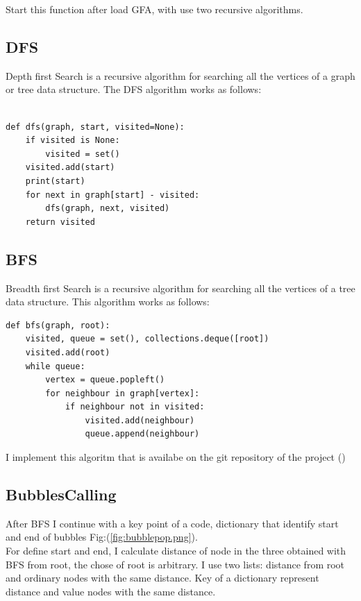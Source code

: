 Start this function after load GFA, with use two recursive algorithms. 

\subsection{DFS}
Depth first Search is a recursive algorithm for searching all the vertices of a graph or tree data structure.
The DFS algorithm works as follows:

\begin{verbatim}

def dfs(graph, start, visited=None):
    if visited is None:
        visited = set()
    visited.add(start)
    print(start)
    for next in graph[start] - visited:
        dfs(graph, next, visited)
    return visited

\end{verbatim}

\subsection{BFS}
Breadth first Search is a recursive algorithm for searching all the vertices of a tree data structure.
This algorithm works as follows:

\begin{verbatim}
def bfs(graph, root): 
    visited, queue = set(), collections.deque([root])
    visited.add(root)
    while queue: 
        vertex = queue.popleft()
        for neighbour in graph[vertex]: 
            if neighbour not in visited: 
                visited.add(neighbour) 
                queue.append(neighbour) 
\end{verbatim}

I implement this algoritm that is availabe on the git repository of the project (\url{}) 


\subsection{BubblesCalling}

After BFS I continue with a key point of a code, dictionary that identify start and end of bubbles Fig:({\ref{fig:bubblepop.png}}).\\

For define start and end, I calculate distance of node in the three obtained with BFS from root, the chose of root is arbitrary. I use two lists: distance from root and ordinary nodes with the same distance.
Key of a dictionary represent distance and value nodes with the same distance. 

